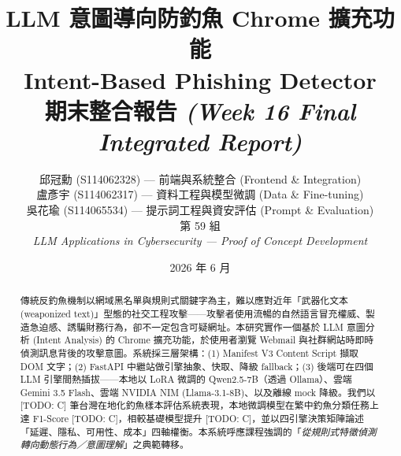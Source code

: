 \documentclass[11pt, a4paper]{article}
\title{
  \vspace{-1.5cm}
  \textbf{\LARGE LLM 意圖導向防釣魚 Chrome 擴充功能} \\[4pt]
  \textbf{\large Intent-Based Phishing Detector} \\[6pt]
  \normalsize 期末整合報告 \textit{(Week 16 Final Integrated Report)}
}
\author{
  \begin{tabular}{c}
    邱冠勳 (S114062328) — 前端與系統整合 (Frontend \& Integration) \\
    盧彥宇 (S114062317) — 資料工程與模型微調 (Data \& Fine-tuning) \\
    吳花瑜 (S114065534) — 提示詞工程與資安評估 (Prompt \& Evaluation) \\[4pt]
    \small 第 59 組 \\
    \small \textit{LLM Applications in Cybersecurity — Proof of Concept Development}
  \end{tabular}
}
\date{2026 年 6 月}
\begin{document}
\maketitle
\vspace{-0.7cm}

\begin{center}
\end{center}

\begin{abstract}
\noindent
傳統反釣魚機制以網域黑名單與規則式關鍵字為主，難以應對近年「武器化文本 (weaponized text)」型態的社交工程攻擊——攻擊者使用流暢的自然語言冒充權威、製造急迫感、誘騙財務行為，卻不一定包含可疑網址。本研究實作一個基於 LLM 意圖分析 (Intent Analysis) 的 Chrome 擴充功能，於使用者瀏覽 Webmail 與社群網站時即時偵測訊息背後的攻擊意圖。系統採三層架構：(1) Manifest V3 Content Script 擷取 DOM 文字；(2) FastAPI 中繼站做引擎抽象、快取、降級 fallback；(3) 後端可在四個 LLM 引擎間熱插拔——本地以 LoRA 微調的 Qwen2.5-7B（透過 Ollama）、雲端 Gemini 3.5 Flash、雲端 NVIDIA NIM (Llama-3.1-8B)、以及離線 mock 降級。我們以 [TODO: C] 筆台灣在地化釣魚樣本評估系統表現，本地微調模型在繁中釣魚分類任務上達 F1-Score [TODO: C]，相較基礎模型提升 [TODO: C]，並以四引擎決策矩陣論述「延遲、隱私、可用性、成本」四軸權衡。本系統呼應課程強調的「\textit{從規則式特徵偵測轉向動態行為／意圖理解}」之典範轉移。
\end{abstract}

\tableofcontents
\newpage

\end{document}
